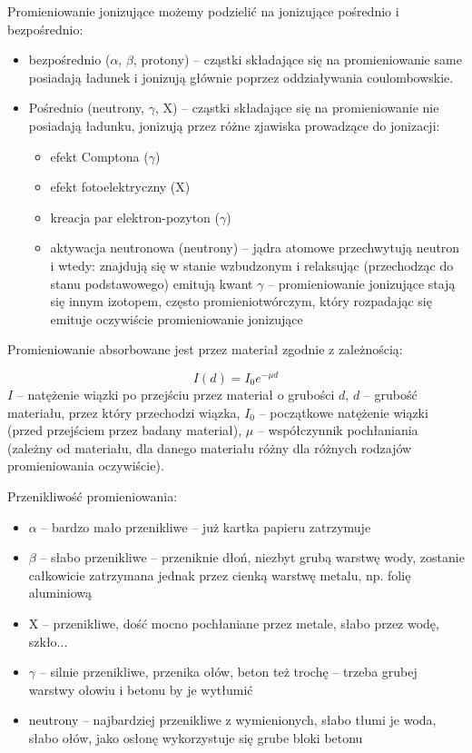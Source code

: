 \documentclass{article}
\begin{document}
\begin{enumerate}
Promieniowanie jonizujące możemy podzielić na jonizujące pośrednio i bezpośrednio:
\begin{itemize}
\item bezpośrednio ($\alpha$, $\beta$, protony) – cząstki składające się na promieniowanie same posiadają ładunek i jonizują głównie poprzez oddziaływania coulombowskie.
\item Pośrednio (neutrony, $\gamma$, X) – cząstki składające się na promieniowanie nie posiadają ładunku, jonizują przez różne zjawiska prowadzące do jonizacji:
\begin{itemize}
\item efekt Comptona ($\gamma$)
\item efekt fotoelektryczny (X)
\item kreacja par elektron-pozyton ($\gamma$)
\item aktywacja neutronowa (neutrony) – jądra atomowe przechwytują neutron i wtedy:
znajdują się w stanie wzbudzonym i relaksując (przechodząc do stanu podstawowego) emitują kwant  $\gamma$ – promieniowanie jonizujące
stają się innym izotopem, często promieniotwórczym, który rozpadając się emituje oczywiście promieniowanie jonizujące

\end{itemize}
\end{itemize}
Promieniowanie absorbowane jest przez materiał zgodnie z zależnością:

$$I(d) = I_0e^{-\mu d}$$
$I$ – natężenie wiązki po przejściu przez materiał o grubości $d$,
$d$ – grubość materiału, przez który przechodzi wiązka,
$I_0$ – początkowe natężenie wiązki (przed przejściem przez badany materiał),
$\mu$ – współczynnik pochłaniania (zależny od materiału, dla danego materiału różny dla różnych rodzajów promieniowania oczywiście).

Przenikliwość promieniowania:
\begin{itemize}
\item $\alpha$ – bardzo mało przenikliwe – już kartka papieru zatrzymuje 


\item $\beta$ – słabo przenikliwe – przeniknie dłoń, niezbyt grubą warstwę wody, zostanie całkowicie zatrzymana jednak przez cienką warstwę metalu, np. folię aluminiową
\item X – przenikliwe, dość mocno pochłaniane przez metale, słabo przez wodę, szkło...
\item $\gamma$ – silnie przenikliwe, przenika ołów, beton też trochę – trzeba grubej warstwy ołowiu i betonu by je wytłumić
\item neutrony – najbardziej przenikliwe z wymienionych, słabo tłumi je woda, słabo ołów, jako osłonę wykorzystuje się grube bloki betonu


\end{itemize}
\end{enumerate}
\end{document}
